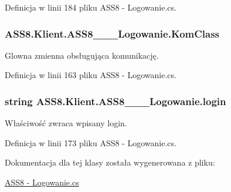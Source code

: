 Definicja w linii 184 pliku ASS8 - Logowanie.cs.\hypertarget{a00001_77ad1d17aa36281e5e19ad1c7b4d631a}{
\subsubsection[{KomClass}]{ ASS8.Klient.ASS8\_\-\_\-\_\-Logowanie.KomClass}}
\label{d8/d84/a00001_77ad1d17aa36281e5e19ad1c7b4d631a}


Glowna zmienna obsługująca komunikację. 



Definicja w linii 163 pliku ASS8 - Logowanie.cs.\hypertarget{a00001_b2688b12edce0a3bd21274587bfe39e5}{
\subsubsection[{login}]{\setlength{\rightskip}{0pt plus 5cm}string ASS8.Klient.ASS8\_\-\_\-\_\-Logowanie.login}}
\label{d8/d84/a00001_b2688b12edce0a3bd21274587bfe39e5}


Właściwość zwraca wpisany login. 



Definicja w linii 173 pliku ASS8 - Logowanie.cs.

Dokumentacja dla tej klasy została wygenerowana z pliku:\begin{CompactItemize}
\item 
\hyperlink{a00040}{ASS8 - Logowanie.cs}\end{CompactItemize}

